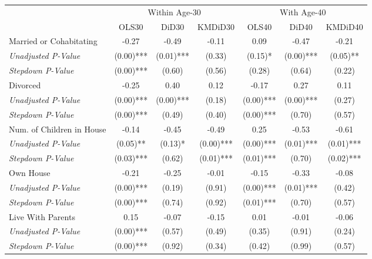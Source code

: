 \begin{tabular}{l c c c c c c}
\toprule
& \multicolumn{3}{c}{Within Age-30} & \multicolumn{3}{c}{With Age-40} \\\cmidrule(lr){2-4} \cmidrule(lr){5-7}
 & OLS30 & DiD30 & KMDiD30 & OLS40 & DiD40 & KMDiD40 \\
\midrule
Married or Cohabitating & -0.27 & -0.49 & -0.11 & 0.09 & -0.47 & -0.21 \\
\quad \textit{Unadjusted P-Value} & (0.00)*** & (0.01)*** & (0.33) & (0.15)* & (0.00)*** & (0.05)** \\
\quad \textit{Stepdown P-Value} & (0.00)*** & (0.60) & (0.56) & (0.28) & (0.64) & (0.22) \\
Divorced & -0.25 & 0.40 & 0.12 & -0.17 & 0.27 & 0.11 \\
\quad \textit{Unadjusted P-Value} & (0.00)*** & (0.00)*** & (0.18) & (0.00)*** & (0.00)*** & (0.27) \\
\quad \textit{Stepdown P-Value} & (0.00)*** & (0.49) & (0.40) & (0.00)*** & (0.70) & (0.57) \\
Num. of Children in House & -0.14 & -0.45 & -0.49 & 0.25 & -0.53 & -0.61 \\
\quad \textit{Unadjusted P-Value} & (0.05)** & (0.13)* & (0.00)*** & (0.00)*** & (0.01)*** & (0.01)*** \\
\quad \textit{Stepdown P-Value} & (0.03)*** & (0.62) & (0.01)*** & (0.01)*** & (0.70) & (0.02)*** \\
Own House & -0.21 & -0.25 & -0.01 & -0.15 & -0.33 & -0.08 \\
\quad \textit{Unadjusted P-Value} & (0.00)*** & (0.19) & (0.91) & (0.00)*** & (0.01)*** & (0.42) \\
\quad \textit{Stepdown P-Value} & (0.00)*** & (0.74) & (0.92) & (0.01)*** & (0.70) & (0.57) \\
Live With Parents & 0.15 & -0.07 & -0.15 & 0.01 & -0.01 & -0.06 \\
\quad \textit{Unadjusted P-Value} & (0.00)*** & (0.57) & (0.49) & (0.35) & (0.91) & (0.24) \\
\quad \textit{Stepdown P-Value} & (0.00)*** & (0.92) & (0.34) & (0.42) & (0.99) & (0.57) \\
\bottomrule
\end{tabular}
